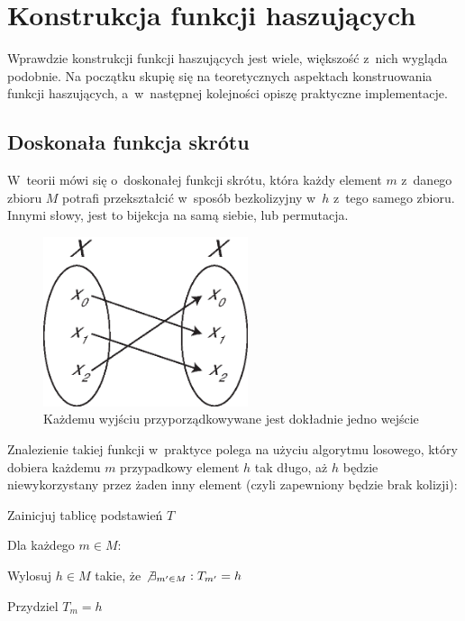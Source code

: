\documentclass[12pt,a4paper,twoside]{article}
\begin{document}
\section{Konstrukcja funkcji haszujących}
\label{sec:hash_construction}
Wprawdzie konstrukcji funkcji haszujących jest wiele, większość z~nich wygląda
podobnie. Na początku skupię się na teoretycznych aspektach konstruowania
funkcji haszujących, a~w~następnej kolejności opiszę praktyczne implementacje.



\subsection{Doskonała funkcja skrótu}
W~teorii mówi się o~doskonałej funkcji skrótu, która każdy element $m$ z~danego
zbioru $M$ potrafi przekształcić w~sposób bezkolizyjny w~$h$ z~tego samego
zbioru. Innymi słowy, jest to bijekcja na samą siebie, lub permutacja.

\begin{figure}[htb!]
    \includegraphics[width=6cm]{img/injection_self.eps}
    \caption{Każdemu wyjściu przyporządkowywane jest dokładnie jedno wejście}
    \label{fig:bijection}
\end{figure}


Znalezienie takiej funkcji w~praktyce polega na użyciu algorytmu losowego,
który dobiera każdemu $m$ przypadkowy element $h$ tak długo, aż $h$ będzie
niewykorzystany przez żaden inny element (czyli zapewniony będzie brak
kolizji):

\begin{myenumerate}

    \item Zainicjuj tablicę podstawień $T$

    \item Dla każdego $m \in M$:

    \begin{myenumerate}

        \item Wylosuj $h \in M$ takie, że $\not \exists_{m' \in M} : T_{m'} =
        h$

        \item Przydziel $T_m = h$

    \end{myenumerate}

\end{myenumerate}
\end{document}
